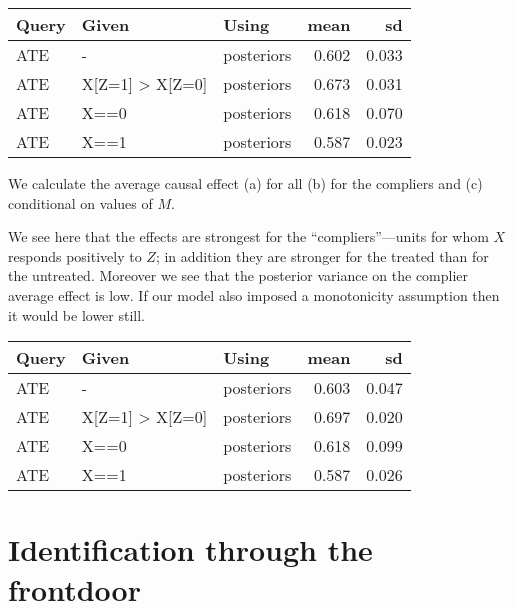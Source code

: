 \documentclass[
  12pt,
]{book}
\newenvironment{Shaded}{\begin{snugshade}}{\end{snugshade}}
\newcommand{\DataTypeTok}[1]{\textcolor[rgb]{0.13,0.29,0.53}{#1}}
\newcommand{\KeywordTok}[1]{\textcolor[rgb]{0.13,0.29,0.53}{\textbf{#1}}}
\newcommand{\NormalTok}[1]{#1}
\newcommand{\OperatorTok}[1]{\textcolor[rgb]{0.81,0.36,0.00}{\textbf{#1}}}
\newcommand{\StringTok}[1]{\textcolor[rgb]{0.31,0.60,0.02}{#1}}
\begin{document}
\begin{tabular}{l|l|l|r|r}
\hline
Query & Given & Using & mean & sd\\
\hline
ATE & - & posteriors & 0.602 & 0.033\\
\hline
ATE & X[Z=1] > X[Z=0] & posteriors & 0.673 & 0.031\\
\hline
ATE & X==0 & posteriors & 0.618 & 0.070\\
\hline
ATE & X==1 & posteriors & 0.587 & 0.023\\
\hline
\end{tabular}

We calculate the average causal effect (a) for all (b) for the compliers and (c) conditional on values of \(M\).

We see here that the effects are strongest for the ``compliers''---units for whom \(X\) responds positively to \(Z\); in addition they are stronger for the treated than for the untreated. Moreover we see that the posterior variance on the complier average effect is low. If our model also imposed a monotonicity assumption then it would be lower still.

\begin{Shaded}
\end{Shaded}

\begin{tabular}{l|l|l|r|r}
\hline
Query & Given & Using & mean & sd\\
\hline
ATE & - & posteriors & 0.603 & 0.047\\
\hline
ATE & X[Z=1] > X[Z=0] & posteriors & 0.697 & 0.020\\
\hline
ATE & X==0 & posteriors & 0.618 & 0.099\\
\hline
ATE & X==1 & posteriors & 0.587 & 0.026\\
\hline
\end{tabular}

\hypertarget{identification-through-the-frontdoor}{%
\section{Identification through the frontdoor}\label{identification-through-the-frontdoor}}
\end{document}
